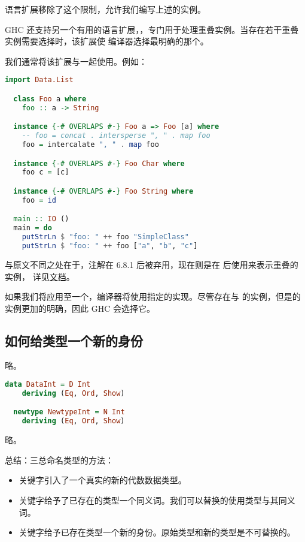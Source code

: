 \documentclass[./main.tex]{subfiles}
\begin{document}
语言扩展移除了这个限制，允许我们编写上述的实例。

GHC 还支持另一个有用的语言扩展，，专门用于处理重叠实例。当存在若干重叠实例需要选择时，该扩展使
编译器选择最明确的那个。

我们通常将该扩展与一起使用。例如：

\begin{lstlisting}[language=Haskell]
  import Data.List

  class Foo a where
    foo :: a -> String

  instance {-# OVERLAPS #-} Foo a => Foo [a] where
    -- foo = concat . intersperse ", " . map foo
    foo = intercalate ", " . map foo

  instance {-# OVERLAPS #-} Foo Char where
    foo c = [c]

  instance {-# OVERLAPS #-} Foo String where
    foo = id

  main :: IO ()
  main = do
    putStrLn $ "foo: " ++ foo "SimpleClass"
    putStrLn $ "foo: " ++ foo ["a", "b", "c"]
\end{lstlisting}

与原文不同之处在于，注解在 6.8.1 后被弃用，现在则是在
后使用来表示重叠的实例，
详见\href{https://ghc.gitlab.haskell.org/ghc/doc/users_guide/exts/instances.html#overlapping-instances}{文档}。

如果我们将应用至一个，编译器将使用指定的实现。尽管存在\acode{[a]}与
的实例，但是的实例更加的明确，因此 GHC 会选择它。

\subsection*{如何给类型一个新的身份}

略。

\begin{lstlisting}[language=Haskell]
  data DataInt = D Int
    deriving (Eq, Ord, Show)

  newtype NewtypeInt = N Int
    deriving (Eq, Ord, Show)
\end{lstlisting}

略。

总结：三总命名类型的方法：

\begin{itemize}
  \item {}关键字引入了一个真实的新的代数数据类型。
  \item {}关键字给予了已存在的类型一个同义词。我们可以替换的使用类型与其同义词。
  \item {}关键字给予已存在类型一个新的身份。原始类型和新的类型是不可替换的。
\end{itemize}
\end{document}
